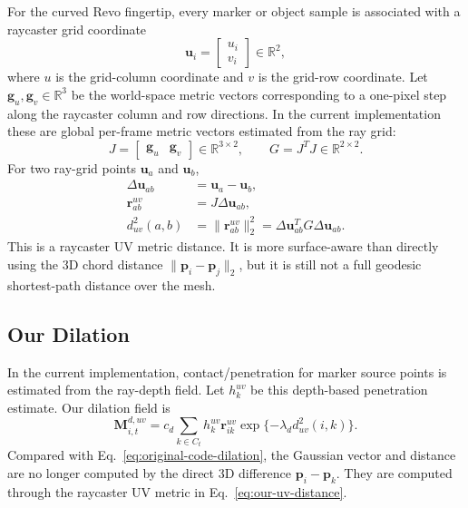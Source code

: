 \documentclass[11pt]{article}
\newcommand{\R}{\mathbb{R}}
\begin{document}
For the curved Revo fingertip, every marker or object sample is associated with
a raycaster grid coordinate
\begin{equation}
    \mathbf{u}_i =
    \begin{bmatrix}
        u_i \\
        v_i
    \end{bmatrix}
    \in \R^2,
\end{equation}
where $u$ is the grid-column coordinate and $v$ is the grid-row coordinate.
Let $\mathbf{g}_u,\mathbf{g}_v\in\R^3$ be the world-space metric vectors
corresponding to a one-pixel step along the raycaster column and row
directions. In the current implementation these are global per-frame metric
vectors estimated from the ray grid:
\begin{equation}
    J
    =
    \begin{bmatrix}
        \mathbf{g}_u & \mathbf{g}_v
    \end{bmatrix}
    \in\R^{3\times2},
    \qquad
    G
    =
    J^T J
    \in\R^{2\times2}.
    \label{eq:our-metric}
\end{equation}
For two ray-grid points $\mathbf{u}_a$ and $\mathbf{u}_b$,
\begin{align}
    \Delta\mathbf{u}_{ab}
    &=
    \mathbf{u}_a-\mathbf{u}_b, \\
    \mathbf{r}^{uv}_{ab}
    &=
    J\Delta\mathbf{u}_{ab}, \\
    d^2_{uv}(a,b)
    &=
    \|\mathbf{r}^{uv}_{ab}\|_2^2
    =
    \Delta\mathbf{u}_{ab}^{T}G\Delta\mathbf{u}_{ab}.
    \label{eq:our-uv-distance}
\end{align}
This is a raycaster UV metric distance. It is more surface-aware than directly
using the 3D chord distance $\|\mathbf{p}_i-\mathbf{p}_j\|_2$, but it is still
not a full geodesic shortest-path distance over the mesh.

\subsection{Our Dilation}

In the current implementation, contact/penetration for marker source points is
estimated from the ray-depth field. Let $h^{uv}_k$ be this depth-based
penetration estimate. Our dilation field is
\begin{equation}
    \mathbf{M}^{d,uv}_{i,t}
    =
    c_d
    \sum_{k\in C_t}
    h^{uv}_k
    \mathbf{r}^{uv}_{ik}
    \exp\{
        -\lambda_d d^2_{uv}(i,k)
    \}.
    \label{eq:our-dilation}
\end{equation}
Compared with Eq.~\eqref{eq:original-code-dilation}, the Gaussian vector and
distance are no longer computed by the direct 3D difference
$\mathbf{p}_i-\mathbf{p}_k$. They are computed through the raycaster UV metric
in Eq.~\eqref{eq:our-uv-distance}.
\end{document}

